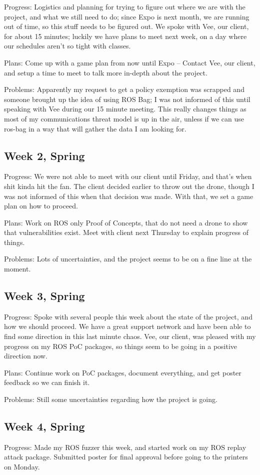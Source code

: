 Progress: Logistics and planning for trying to figure out where we are with the project, and what we still need to do; since Expo is next month, we are running out of time, so this stuff needs to be figured out. We spoke with Vee, our client, for about 15 minutes; luckily we have plans to meet next week, on a day where our schedules aren't so tight with classes.

Plans: Come up with a game plan from now until Expo -- Contact Vee, our client, and setup a time to meet to talk more in-depth about the project.

Problems: Apparently my request to get a policy exemption was scrapped and someone brought up the idea of using ROS Bag; I was not informed of this until speaking with Vee during our 15 minute meeting. This really changes things as most of my communications threat model is up in the air, unless if we can use ros-bag in a way that will gather the data I am looking for.
\subsection{Week 2, Spring}
Progress: We were not able to meet with our client until Friday, and that's when shit kinda hit the fan. The client decided earlier to throw out the drone, though I was not informed of this when that decision was made. With that, we set a game plan on how to proceed.

Plans: Work on ROS only Proof of Concepts, that do not need a drone to show that vulnerabilities exist. Meet with client next Thursday to explain progress of things.

Problems: Lots of uncertainties, and the project seems to be on a fine line at the moment.
\subsection{Week 3, Spring}
Progress: Spoke with several people this week about the state of the project, and how we should proceed. We have a great support network and have been able to find some direction in this last minute chaos. Vee, our client, was pleased with my progress on my ROS PoC packages, so things seem to be going in a positive direction now.

Plans: Continue work on PoC packages, document everything, and get poster feedback so we can finish it.

Problems: Still some uncertainties regarding how the project is going.
\subsection{Week 4, Spring}
Progress: Made my ROS fuzzer this week, and started work on my ROS replay attack package. Submitted poster for final approval before going to the printers on Monday.

